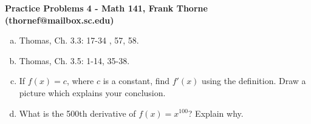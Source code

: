 \documentclass[12pt]{article}
\begin{document}
\setlength{\topmargin}{-2mm}





\begin{center}{\bf Practice Problems 4 - Math 141, Frank Thorne (thornef@mailbox.sc.edu)}
\end{center}
\begin{enumerate}[(a)]

\item
Thomas, Ch. 3.3: 17-34 , 57, 58.

\item
Thomas, Ch. 3.5: 1-14, 35-38.

\item

If $f(x) = c$, where $c$ is a constant, find $f'(x)$ using the definition.
Draw a picture which explains your conclusion.

\item
What is the 500th derivative of $f(x) = x^{100}$? Explain why.

\end{enumerate}
\end{document}
